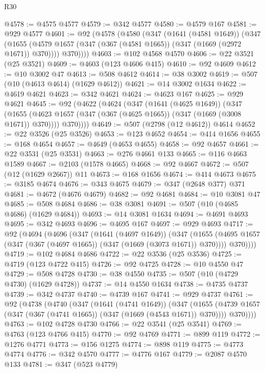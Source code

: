 \begin{lexlean}{R30}
\begin{coremodule}
@4578 := @4575 @4577
@4579 := @342 @4577
@4580 := @4579 @167
@4581 := @929 @4577
@4601 := @92
    (@4578
      (@4580
        (@347
          (@1641 (@4581 @1649))
          (@347
            (@1655 (@4579 @1657 (@347 (@367 (@4581 @1665)) (@347 (@1669 (@2972 @1671)) @370))))
            @370))))
@4603 := @102 @4568 @4570
@4606 := @22 @3521 (@25 @3521)
@4609 := @4603 (@123 @4606 @415)
@4610 := @92 @4609
@4612 := @10 @3002 @47
@4613 := @508 @4612
@4614 := @38 @3002
@4619 := @507 (@10 (@4613 @4614) (@1629 @4612))
@4621 := @14 @3002 @1634
@4622 := @4619 @4621
@4623 := @342 @4621
@4624 := @4623 @167
@4625 := @929 @4621
@4645 := @92
    (@4622
      (@4624
        (@347
          (@1641 (@4625 @1649))
          (@347
            (@1655 (@4623 @1657 (@347 (@367 (@4625 @1665)) (@347 (@1669 (@3008 @1671)) @370))))
            @370))))
@4649 := @507 (@2798 (@12 @4612)) @4614
@4652 := @22 @3526 (@25 @3526)
@4653 := @123 @4652
@4654 := @414 @1656
@4655 := @168 @4654
@4657 := @4649 (@4653 @4655)
@4658 := @92 @4657
@4661 := @22 @3531 (@25 @3531)
@4663 := @276 @4661 @133
@4665 := @116 @4663 @1589
@4667 := @2103 (@1578 @4665)
@4668 := @92 @4667
@4672 := @507 (@12 (@1629 @2667)) @11
@4673 := @168 @1656
@4674 := @414 @4673
@4675 := @3185 @4674
@4676 := @343 @4675
@4679 := @347 (@2648 @377) @371
@4681 := @4672 (@4676 @4679)
@4682 := @92 @4681
@4684 := @10 @3081 @47
@4685 := @508 @4684
@4686 := @38 @3081
@4691 := @507 (@10 (@4685 @4686) (@1629 @4684))
@4693 := @14 @3081 @1634
@4694 := @4691 @4693
@4695 := @342 @4693
@4696 := @4695 @167
@4697 := @929 @4693
@4717 := @92
    (@4694
      (@4696
        (@347
          (@1641 (@4697 @1649))
          (@347
            (@1655 (@4695 @1657 (@347 (@367 (@4697 @1665)) (@347 (@1669 (@3073 @1671)) @370))))
            @370))))
@4719 := @102 @4684 @4686
@4722 := @22 @3536 (@25 @3536)
@4725 := @4719 (@123 @4722 @415)
@4726 := @92 @4725
@4728 := @10 @4550 @47
@4729 := @508 @4728
@4730 := @38 @4550
@4735 := @507 (@10 (@4729 @4730) (@1629 @4728))
@4737 := @14 @4550 @1634
@4738 := @4735 @4737
@4739 := @342 @4737
@4740 := @4739 @167
@4741 := @929 @4737
@4761 := @92
    (@4738
      (@4740
        (@347
          (@1641 (@4741 @1649))
          (@347
            (@1655 (@4739 @1657 (@347 (@367 (@4741 @1665)) (@347 (@1669 (@4543 @1671)) @370))))
            @370))))
@4763 := @102 @4728 @4730
@4766 := @22 @3541 (@25 @3541)
@4769 := @4763 (@123 @4766 @415)
@4770 := @92 @4769
@4771 := @899 @119
@4772 := @1276 @4771
@4773 := @156 @1275
@4774 := @898 @119
@4775 := @4773 @4774
@4776 := @342 @4570
@4777 := @4776 @167
@4779 := @2087 @4570 @133
@4781 := @347 (@523 @4779)

\end{coremodule}
\end{lexlean}
